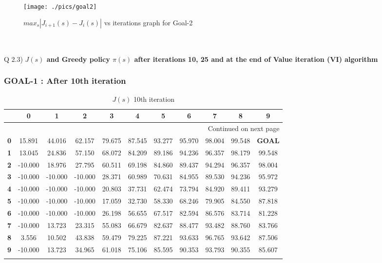 \documentclass{article}
\begin{document}
\begin{figure}[!htb]
    \centering
    \texttt{[image: ./pics/goal2]}
    \caption{$max_s |J_{i+1}(s) - J_i(s)|$ vs iterations graph for Goal-2}
    \label{fig:maze}
\end{figure}

~\\\\
Q 2.3) \textbf{$J(s)$ and Greedy policy 
$\pi(s)$ after iterations 10, 25 and at the end of Value iteration (VI) algorithm }

\subsubsection*{GOAL-1 : After 10th iteration}

\begin{longtable}{|c|c|c|c|c|c|c|c|c|c|c|}
\toprule
{} &       0 &       1 &       2 &       3 &       4 &       5 &       6 &       7 &       8 &       9 \\
\midrule
\endhead
\midrule
\multicolumn{11}{r}{{Continued on next page}} \\
\midrule
\endfoot

\bottomrule
\endlastfoot
\textbf{0} &  15.891 &  44.016 &  62.157 &  79.675 &  87.545 &  93.277 &  95.970 &  98.004 &  99.548 &  \textbf{GOAL} \\\hline
\textbf{1} &  13.045 &  24.836 &  57.150 &  68.072 &  84.209 &  89.186 &  94.236 &  96.357 &  98.179 &  99.548 \\\hline
\textbf{2} & -10.000 &  18.976 &  27.795 &  60.511 &  69.198 &  84.860 &  89.437 &  94.294 &  96.357 &  98.004 \\\hline
\textbf{3} & -10.000 & -10.000 & -10.000 &  28.371 &  60.989 &  70.631 &  84.955 &  89.530 &  94.236 &  95.972 \\\hline
\textbf{4} & -10.000 & -10.000 & -10.000 &  20.803 &  37.731 &  62.474 &  73.794 &  84.920 &  89.411 &  93.279 \\\hline
\textbf{5} & -10.000 & -10.000 & -10.000 &  17.059 &  32.730 &  58.330 &  68.246 &  79.905 &  84.550 &  87.818 \\\hline
\textbf{6} & -10.000 & -10.000 & -10.000 &  26.198 &  56.655 &  67.517 &  82.594 &  86.576 &  83.714 &  81.228 \\\hline
\textbf{7} & -10.000 &  13.723 &  23.315 &  55.083 &  66.679 &  82.637 &  88.477 &  93.482 &  88.760 &  83.766 \\\hline
\textbf{8} &   3.556 &  10.502 &  43.838 &  59.479 &  79.225 &  87.221 &  93.633 &  96.765 &  93.642 &  87.506 \\\hline
\textbf{9} & -10.000 &  13.723 &  34.965 &  61.018 &  75.106 &  85.595 &  90.353 &  93.793 &  90.355 &  85.607 \\\hline
\caption{$J(s)$ 10th iteration}
\end{longtable}
\end{document}
